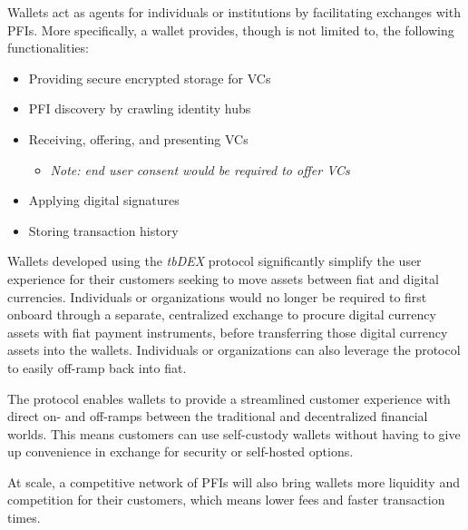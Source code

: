\documentclass[11pt]{article}
\begin{document}
\vspace{1\baselineskip}
Wallets act as agents for individuals or institutions by facilitating exchanges with PFIs. More specifically, a wallet provides, though is not limited to, the following functionalities:

\begin{itemize}
	\item Providing secure encrypted storage for VCs

	\item PFI discovery by crawling identity hubs

	\item Receiving, offering, and presenting VCs

\begin{itemize}
	\item \textit{Note: end user consent would be required to offer VCs}

\end{itemize}
	\item Applying digital signatures

	\item Storing transaction history

\vspace{1\baselineskip}
\end{itemize}
Wallets developed using the \textit{tbDEX} protocol significantly simplify the user experience for their customers seeking to move assets between fiat and digital currencies. Individuals or organizations would no longer be required to first onboard through a separate, centralized exchange to procure digital currency assets with fiat payment instruments, before transferring those digital currency assets into the wallets. Individuals or organizations can also leverage the protocol to easily off-ramp back into fiat. 

\vspace{1\baselineskip}
The protocol enables wallets to provide a streamlined customer experience with direct on- and off-ramps between the traditional and decentralized financial worlds. This means customers can use self-custody wallets without having to give up convenience in exchange for security or self-hosted options. 

\vspace{1\baselineskip}
At scale, a competitive network of PFIs will also bring wallets more liquidity and competition for their customers, which means lower fees and faster transaction times.
\end{document}
